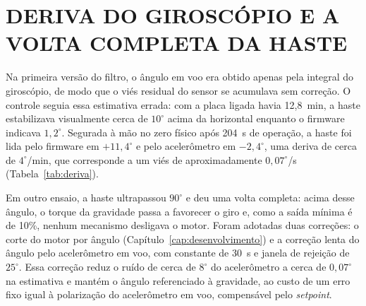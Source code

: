 \section{DERIVA DO GIROSCÓPIO E A VOLTA COMPLETA DA HASTE}\label{sec:deriva}

Na primeira versão do filtro, o ângulo em voo era obtido apenas pela integral do giroscópio, de modo que o viés residual do sensor se acumulava sem correção. O controle seguia essa estimativa errada: com a placa ligada havia 12,8~min, a haste estabilizava visualmente cerca de $10^\circ$ acima da horizontal enquanto o firmware indicava $1{,}2^\circ$. Segurada à mão no zero físico após 204~s de operação, a haste foi lida pelo firmware em $+11{,}4^\circ$ e pelo acelerômetro em $-2{,}4^\circ$, uma deriva de cerca de $4^\circ$/min, que corresponde a um viés de aproximadamente $0{,}07^\circ$/s (Tabela~\ref{tab:deriva}).

Em outro ensaio, a haste ultrapassou $90^\circ$ e deu uma volta completa: acima desse ângulo, o torque da gravidade passa a favorecer o giro e, como a saída mínima é de 10\%, nenhum mecanismo desligava o motor. Foram adotadas duas correções: o corte do motor por ângulo (Capítulo~\ref{cap:desenvolvimento}) e a correção lenta do ângulo pelo acelerômetro em voo, com constante de 30~s e janela de rejeição de $25^\circ$. Essa correção reduz o ruído de cerca de $8^\circ$ do acelerômetro a cerca de $0{,}07^\circ$ na estimativa e mantém o ângulo referenciado à gravidade, ao custo de um erro fixo igual à polarização do acelerômetro em voo, compensável pelo \textit{setpoint}.
